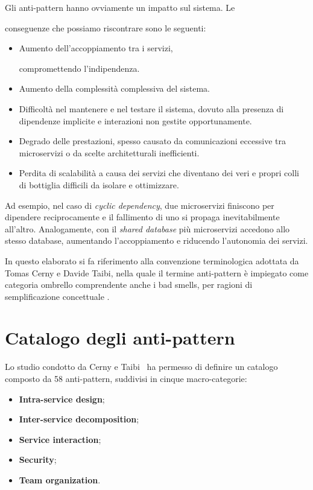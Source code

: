 Gli anti-pattern hanno ovviamente un impatto sul sistema. Le 

conseguenze che possiamo riscontrare sono le seguenti:
\begin{itemize}
    \item Aumento dell'accoppiamento tra i servizi, 
    
    compromettendo l'indipendenza.
    \item Aumento della complessità complessiva del sistema. 
    \item Difficoltà nel mantenere e nel testare il sistema, dovuto alla presenza di dipendenze implicite e interazioni non gestite opportunamente. 
    \item Degrado delle prestazioni, spesso causato da comunicazioni eccessive tra microservizi o da scelte architetturali inefficienti.
    \item Perdita di scalabilità a causa dei servizi che diventano dei veri e propri colli di bottiglia  difficili da isolare e ottimizzare. 
\end{itemize}

Ad esempio, nel caso di \textit{cyclic dependency}, due microservizi finiscono per dipendere reciprocamente e il fallimento di uno si propaga inevitabilmente all’altro. Analogamente, con il \textit{shared database} più microservizi accedono allo stesso database, aumentando l’accoppiamento e riducendo l’autonomia dei servizi.

In questo elaborato si fa riferimento alla convenzione terminologica adottata da Tomas Cerny e Davide Taibi, nella quale il termine anti-pattern è impiegato come categoria ombrello comprendente anche i bad smells, per ragioni di semplificazione concettuale \cite{CernyCatalogo}.

\section{Catalogo degli anti-pattern}

Lo studio condotto da Cerny e Taibi~\cite{CernyCatalogo} ha permesso di definire un catalogo composto da 58 anti-pattern, suddivisi in cinque macro-categorie:
\begin{itemize}
  \item \textbf{Intra-service design};
  \item \textbf{Inter-service decomposition};
  \item \textbf{Service interaction};
  \item \textbf{Security};
  \item \textbf{Team organization}.
\end{itemize}

